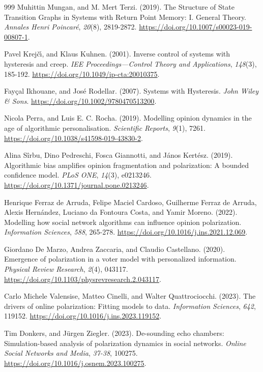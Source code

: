 \begin{thebibliography}{999}
Muhittin Mungan, and M. Mert Terzi. (2019). The Structure of State Transition Graphs in Systems with Return Point Memory: I. General Theory. \textit{Annales Henri Poincar\'{e}}, \textit{20}(8), 2819-2872. \url{https://doi.org/10.1007/s00023-019-00807-1}.

Pavel Krej\v{c}\'{\i}, and Klaus Kuhnen. (2001). Inverse control of systems with hysteresis and creep. \textit{IEE Proceedings---Control Theory and Applications}, \textit{148}(3), 185-192. \url{https://doi.org/10.1049/ip-cta:20010375}.

Fay\c{c}al Ikhouane, and Jos\'{e} Rodellar. (2007). Systems with Hysteresis. \textit{John Wiley \& Sons}. \url{https://doi.org/10.1002/9780470513200}.

Nicola Perra, and Luis E. C. Rocha. (2019). Modelling opinion dynamics in the age of algorithmic personalisation. \textit{Scientific Reports}, \textit{9}(1), 7261. \url{https://doi.org/10.1038/s41598-019-43830-2}.

Alina S\^{i}rbu, Dino Pedreschi, Fosca Giannotti, and J\'{a}nos Kert\'{e}sz. (2019). Algorithmic bias amplifies opinion fragmentation and polarization: A bounded confidence model. \textit{PLoS ONE}, \textit{14}(3), e0213246. \url{https://doi.org/10.1371/journal.pone.0213246}.

Henrique Ferraz de Arruda, Felipe Maciel Cardoso, Guilherme Ferraz de Arruda, Alexis Hern\'{a}ndez, Luciano da Fontoura Costa, and Yamir Moreno. (2022). Modelling how social network algorithms can influence opinion polarization. \textit{Information Sciences}, \textit{588}, 265-278. \url{https://doi.org/10.1016/j.ins.2021.12.069}.

Giordano De Marzo, Andrea Zaccaria, and Claudio Castellano. (2020). Emergence of polarization in a voter model with personalized information. \textit{Physical Review Research}, \textit{2}(4), 043117. \url{https://doi.org/10.1103/physrevresearch.2.043117}.

Carlo Michele Valensise, Matteo Cinelli, and Walter Quattrociocchi. (2023). The drivers of online polarization: Fitting models to data. \textit{Information Sciences}, \textit{642}, 119152. \url{https://doi.org/10.1016/j.ins.2023.119152}.

Tim Donkers, and J\"{u}rgen Ziegler. (2023). De-sounding echo chambers: Simulation-based analysis of polarization dynamics in social networks. \textit{Online Social Networks and Media}, \textit{37-38}, 100275. \url{https://doi.org/10.1016/j.osnem.2023.100275}.


\end{thebibliography}
